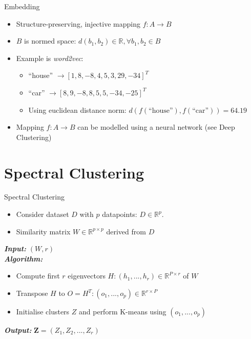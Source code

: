 \documentclass[xcolor=table,mathserif,9pt]{beamer}    %
\begin{document}
\begin{frame}{Embedding}

	\begin{itemize}
		\item Structure-preserving, injective mapping $f: A \to B$
		\item $B$ is normed space: $d(b_1,b_2) \in \mathbb{R}, \forall b_1,b_2 \in B$
		\item Example is \emph{word2vec}: 
			\begin{itemize}
				\item ``house'' $\to \left[1, 8, -8, 4, 5, 3, 29, -34\right]^{T}$
				\item ``car'' $\to \left[8,9, -8, 8, 5, 5, -34, -25\right]^{T}$
				\item Using euclidean distance norm: $d(f(\text{``house''}),f(\text{``car''})) = 64.19$ 
			\end{itemize}
		\item Mapping $f: A \to B$ can be modelled using a neural network (see Deep Clustering)
	\end{itemize}



\end{frame}

\section{Spectral Clustering}%
\label{sec:spectral_clustering}

\begin{frame}{Spectral Clustering}
\begin{itemize}
	\item Consider dataset $D$ with $p$ datapoints: $D \in \mathbb{R}^p$.
	\item Similarity matrix $W \in \mathbb{R}^{p \times p}$ derived from $D$
\end{itemize}
\vspace{10mm}
\begin{algorithm}[H]
	\LinesNumbered
	\emph{\textbf{Input: }} $(W, r)$ \\
	\emph{\textbf{Algorithm: }}
	\begin{itemize}
		\item Compute first $r$ eigenvectors $H: (h_1,... ,h_r) \in \mathbb{R}^{P \times r}$ of $W$ 
		\item Transpose $H$ to $O = H^T: (o_1,... ,o_p) \in \mathbb{R}^{r \times P}$ 
		\item Initialise clusters $Z$ and perform K-means \cite{Steinhaus56} using $(o_1,... ,o_p)$ 
	\end{itemize}
	\emph{\textbf{Output: }}$\textbf{Z} = (Z_1, Z_2, ..., Z_r)$
\end{algorithm}
\end{frame}
\end{document}

